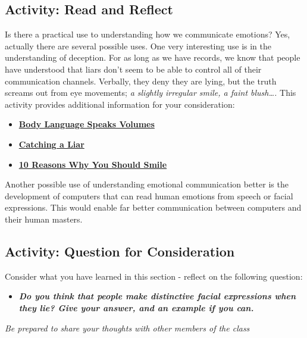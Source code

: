 \documentclass[
]{book}
\providecommand{\tightlist}{%
  \setlength{\itemsep}{0pt}\setlength{\parskip}{0pt}}
\begin{document}
\hypertarget{activity-read-and-reflect-13}{%
\subsection*{Activity: Read and Reflect}\label{activity-read-and-reflect-13}}

\begin{reflect}
Is there a practical use to understanding how we communicate emotions? Yes, actually there are several possible uses. One very interesting use is in the understanding of deception. For as long as we have records, we know that people have understood that liars don't seem to be able to control all of their communication channels. Verbally, they deny they are lying, but the truth screams out from eye movements; \emph{a slightly irregular smile, a faint blush\ldots.} This activity provides additional information for your consideration:

\begin{itemize}
\tightlist
\item
  \href{http://www.positive-way.com/body.htm}{\textbf{Body Language Speaks Volumes}}\\
\item
  \href{http://www.sciencedaily.com/releases/1999/05/990528003127.htm}{\textbf{Catching a Liar}}\\
\item
  \href{https://www.lifehack.org/358476/10-reasons-you-should-smile-more-often}{\textbf{10 Reasons Why You Should Smile}}
\end{itemize}

Another possible use of understanding emotional communication better is the development of computers that can read human emotions from speech or facial expressions. This would enable far better communication between computers and their human masters.
\end{reflect}

\hypertarget{activity-question-for-consideration-6}{%
\subsection*{Activity: Question for Consideration}\label{activity-question-for-consideration-6}}

\begin{reflect}
Consider what you have learned in this section - reflect on the following question:

\begin{itemize}
\tightlist
\item
  \textbf{\emph{Do you think that people make distinctive facial expressions when they lie? Give your answer, and an example if you can.}}
\end{itemize}

\emph{Be prepared to share your thoughts with other members of the class}
\end{reflect}
\end{document}
